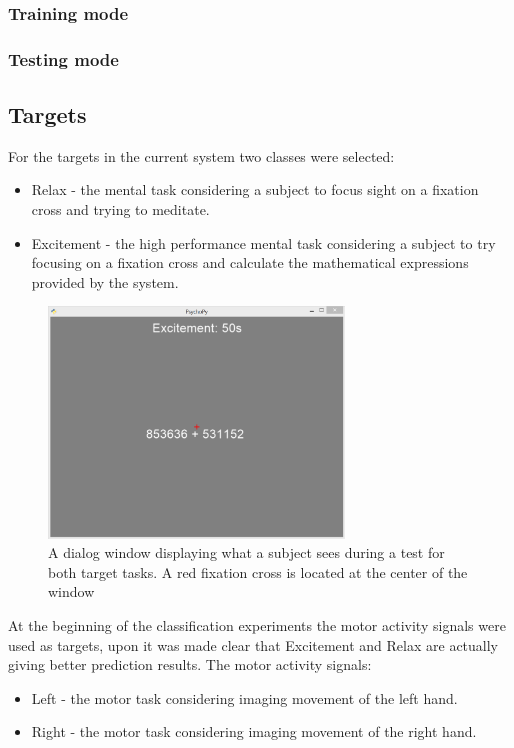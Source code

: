 \documentclass[12pt]{article}
\begin{document}
\subsubsection{Training mode}
\subsubsection{Testing mode}

\subsection{Targets}
For the targets in the current system two classes were selected: 
\begin{itemize}
\item Relax - the mental task considering a subject to focus sight on a fixation cross and trying to meditate.
\item Excitement - the high performance mental task considering a subject to try focusing on a fixation cross and calculate the mathematical expressions provided by the system.
\end{itemize}

\begin{figure} [H]
\begin{center}
\includegraphics[width=0.7\textwidth]{test_ui}
\caption{A dialog window displaying what a subject sees during a test for both target tasks. A red fixation cross is located at the center of the window}
\label{fig:fnCompModel}
\end{center}
\end{figure}

At the beginning of the classification experiments the motor activity signals were used as targets, upon it was made clear that Excitement and Relax are actually giving better prediction results. The motor activity signals:
\begin{itemize}
\item Left - the motor task considering imaging movement of the left hand.
\item Right - the motor task considering imaging movement of the right hand.
\end{itemize}
\end{document}
